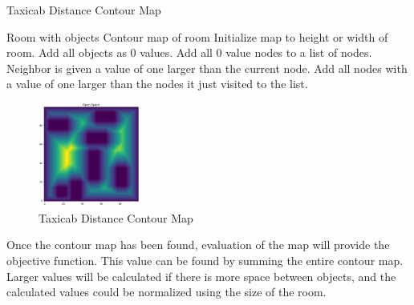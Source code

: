 \documentclass[sigconf,authordraft]{acmart}
\begin{document}
    \begin{algorithm}
        \caption{Taxicab Distance Contour Map}
        \label{taxicab_eval}
        \begin{algorithmic}
            \renewcommand{\algorithmicrequire}{\textbf{Input:}}
            \renewcommand{\algorithmicensure}{\textbf{Output:}}
            \REQUIRE Room with objects
            \ENSURE Contour map of room
            \STATE Initialize map to height or width of room.
            \STATE Add all objects as 0 values.
            \STATE Add all 0 value nodes to a list of nodes.
                            \STATE Neighbor is given a value of one larger than the current node.
                        \ENDIF
                    \ENDFOR
                \ENDFOR
                \STATE Add all nodes with a value of one larger than the nodes it just visited to the list.
            \ENDWHILE
        \end{algorithmic}
    \end{algorithm}

    \begin{figure}
        \centering
        \includegraphics[width=0.3\textwidth]{contour_map_taxicab.png}
        \caption{Taxicab Distance Contour Map}
        \label{taxicab_dist_fig}
    \end{figure}

    Once the contour map has been found, evaluation of the map will provide the objective function. This value can be found by summing the entire contour map. Larger values will be calculated if there is more space between objects, and the calculated values could be normalized using the size of the room.
    
\end{document}
